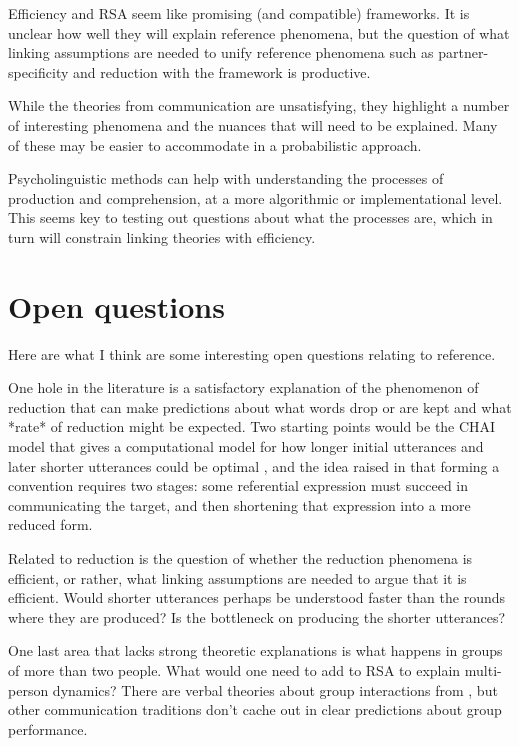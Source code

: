 \documentclass[]{article}
\begin{document}

Efficiency and RSA seem like promising (and compatible) frameworks. It is unclear how well they will explain reference phenomena, but the question of what linking assumptions are needed to unify reference phenomena such as partner-specificity and reduction with the framework is productive. %

While the theories from communication are unsatisfying, they highlight a number of interesting phenomena and the nuances that will need to be explained. Many of these may be easier to accommodate in a probabilistic approach. 

Psycholinguistic methods can help with understanding the processes of production and comprehension, at a more algorithmic or implementational level. This seems key to testing out questions about what the processes are, which in turn will constrain linking theories with efficiency. 

\section{Open questions}
Here are what I think are some interesting open questions relating to reference. 

One hole in the literature is a satisfactory explanation of the phenomenon of reduction that can make predictions about what words drop or are kept and what *rate* of reduction might be expected. Two starting points would be the CHAI model that gives a computational model for how longer initial utterances and later shorter utterances could be optimal \cite{hawkins2021}, and the idea raised in \cite{leung2023} that forming a convention requires two stages: some referential expression must succeed in communicating the target, and then shortening that expression into a more reduced form.

Related to reduction is the question of whether the reduction phenomena is efficient, or rather, what linking assumptions are needed to argue that it is efficient. Would shorter utterances perhaps be understood faster than the rounds where they are produced? Is the bottleneck on producing the shorter utterances? 

One last area that lacks strong theoretic explanations is what happens in groups of more than two people. What would one need to add to RSA to explain multi-person dynamics? There are verbal theories about group interactions from \cite{yoon2018}, but other communication traditions don't cache out in clear predictions about group performance. 
\end{document}
